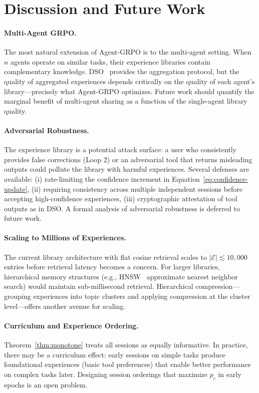 \section{Discussion and Future Work}

\label{sec:discussion}

\paragraph{Multi-Agent GRPO.}
The most natural extension of Agent-GRPO is to the multi-agent setting. When
$n$ agents operate on similar tasks, their experience libraries contain
complementary knowledge. DSO~\cite{hanzo2026dso} provides the aggregation
protocol, but the quality of aggregated experiences depends critically on the
quality of each agent's library---precisely what Agent-GRPO optimizes. Future
work should quantify the marginal benefit of multi-agent sharing as a function
of the single-agent library quality.

\paragraph{Adversarial Robustness.}
The experience library is a potential attack surface: a user who consistently
provides false corrections (Loop 2) or an adversarial tool that returns
misleading outputs could pollute the library with harmful experiences. Several
defenses are available: (i) rate-limiting the confidence increment in
Equation~\eqref{eq:confidence-update}, (ii) requiring consistency across
multiple independent sessions before accepting high-confidence experiences,
(iii) cryptographic attestation of tool outputs as in DSO. A formal analysis
of adversarial robustness is deferred to future work.

\paragraph{Scaling to Millions of Experiences.}
The current library architecture with flat cosine retrieval scales to
$|\mathcal{E}| \lesssim 10{,}000$ entries before retrieval latency becomes a
concern. For larger libraries, hierarchical memory structures (e.g.,
HNSW~\cite{malkov2018efficient} approximate nearest neighbor search) would
maintain sub-millisecond retrieval. Hierarchical compression---grouping
experiences into topic clusters and applying compression at the cluster
level---offers another avenue for scaling.

\paragraph{Curriculum and Experience Ordering.}
Theorem~\ref{thm:monotone} treats all sessions as equally informative. In
practice, there may be a curriculum effect: early sessions on simple tasks
produce foundational experiences (basic tool preferences) that enable better
performance on complex tasks later. Designing session orderings that maximize
$p_c$ in early epochs is an open problem.

